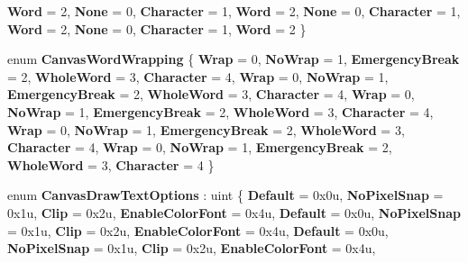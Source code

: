 \begin{DoxyCompactItemize}
{\bfseries Word} = 2, 
{\bfseries None} = 0, 
{\bfseries Character} = 1, 
\newline
{\bfseries Word} = 2, 
{\bfseries None} = 0, 
{\bfseries Character} = 1, 
{\bfseries Word} = 2, 
\newline
{\bfseries None} = 0, 
{\bfseries Character} = 1, 
{\bfseries Word} = 2
 \}
\item 
\mbox{\label{namespace_microsoft_1_1_graphics_1_1_canvas_1_1_text_aad13d6b470583df1dcc8167f6568eb39}} 
enum {\bfseries Canvas\+Word\+Wrapping} \{ \newline
{\bfseries Wrap} = 0, 
{\bfseries No\+Wrap} = 1, 
{\bfseries Emergency\+Break} = 2, 
{\bfseries Whole\+Word} = 3, 
\newline
{\bfseries Character} = 4, 
{\bfseries Wrap} = 0, 
{\bfseries No\+Wrap} = 1, 
{\bfseries Emergency\+Break} = 2, 
\newline
{\bfseries Whole\+Word} = 3, 
{\bfseries Character} = 4, 
{\bfseries Wrap} = 0, 
{\bfseries No\+Wrap} = 1, 
\newline
{\bfseries Emergency\+Break} = 2, 
{\bfseries Whole\+Word} = 3, 
{\bfseries Character} = 4, 
{\bfseries Wrap} = 0, 
\newline
{\bfseries No\+Wrap} = 1, 
{\bfseries Emergency\+Break} = 2, 
{\bfseries Whole\+Word} = 3, 
{\bfseries Character} = 4, 
\newline
{\bfseries Wrap} = 0, 
{\bfseries No\+Wrap} = 1, 
{\bfseries Emergency\+Break} = 2, 
{\bfseries Whole\+Word} = 3, 
\newline
{\bfseries Character} = 4
 \}
\item 
\mbox{\label{namespace_microsoft_1_1_graphics_1_1_canvas_1_1_text_a186331309945bc8dcbfe364bc6f55fdb}} 
enum {\bfseries Canvas\+Draw\+Text\+Options} \+: uint \{ \newline
{\bfseries Default} = 0x0u, 
{\bfseries No\+Pixel\+Snap} = 0x1u, 
{\bfseries Clip} = 0x2u, 
{\bfseries Enable\+Color\+Font} = 0x4u, 
\newline
{\bfseries Default} = 0x0u, 
{\bfseries No\+Pixel\+Snap} = 0x1u, 
{\bfseries Clip} = 0x2u, 
{\bfseries Enable\+Color\+Font} = 0x4u, 
\newline
{\bfseries Default} = 0x0u, 
{\bfseries No\+Pixel\+Snap} = 0x1u, 
{\bfseries Clip} = 0x2u, 
{\bfseries Enable\+Color\+Font} = 0x4u, 
\newline

\end{DoxyCompactItemize}
